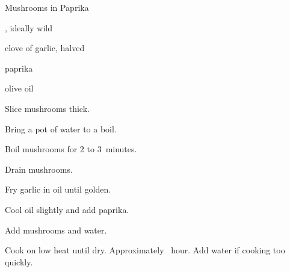 \begin{recipe}{Mushrooms in Paprika}{}{}

\begin{ingredients}
\item {}, ideally wild
\item clove of garlic, halved
\item paprika
\item olive oil
\end{ingredients}

\begin{directions}
\item Slice mushrooms  thick.
\item Bring a pot of water to a boil.
\item Boil mushrooms for 2 to 3~minutes.
\item Drain mushrooms.
\item Fry garlic in oil until golden.
\item Cool oil slightly and add paprika.
\item Add mushrooms and \C{\half} water.
\item Cook on low heat until dry. Approximately \half~hour. Add water if cooking too quickly.
\end{directions}

\end{recipe}
